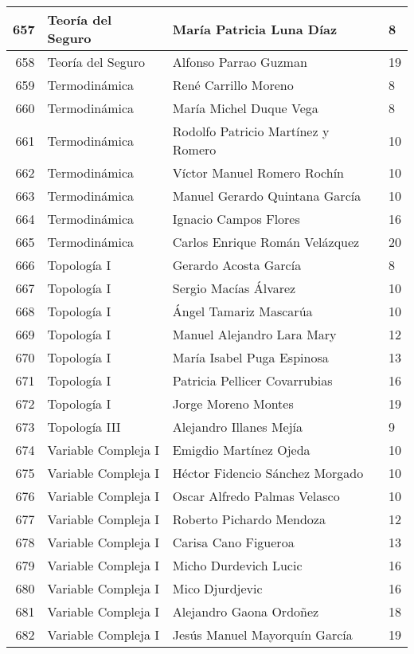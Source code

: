 \begin{table}[ht]
\begin{tabular}{rlll}
  657 & Teoría del Seguro & María Patricia Luna Díaz & 8 \\ \hline
  658 & Teoría del Seguro & Alfonso Parrao Guzman & 19 \\ \hline
  659 & Termodinámica & René Carrillo Moreno & 8 \\ \hline
  660 & Termodinámica & María Michel Duque Vega & 8 \\ \hline
  661 & Termodinámica & Rodolfo Patricio Martínez y Romero & 10 \\ \hline
  662 & Termodinámica & Víctor Manuel Romero Rochín & 10 \\ \hline
  663 & Termodinámica & Manuel Gerardo Quintana García & 10 \\ \hline
  664 & Termodinámica & Ignacio Campos Flores & 16 \\ \hline
  665 & Termodinámica & Carlos Enrique Román Velázquez & 20 \\ \hline
  666 & Topología I & Gerardo Acosta García & 8 \\ \hline
  667 & Topología I & Sergio Macías Álvarez & 10 \\ \hline
  668 & Topología I & Ángel Tamariz Mascarúa & 10 \\ \hline
  669 & Topología I & Manuel Alejandro Lara Mary & 12 \\ \hline
  670 & Topología I & María Isabel Puga Espinosa & 13 \\ \hline
  671 & Topología I & Patricia Pellicer Covarrubias & 16 \\ \hline
  672 & Topología I & Jorge Moreno Montes & 19 \\ \hline
  673 & Topología III & Alejandro Illanes Mejía & 9 \\ \hline
  674 & Variable Compleja I & Emigdio Martínez Ojeda & 10 \\ \hline
  675 & Variable Compleja I & Héctor Fidencio Sánchez Morgado & 10 \\ \hline
  676 & Variable Compleja I & Oscar Alfredo Palmas Velasco & 10 \\ \hline
  677 & Variable Compleja I & Roberto Pichardo Mendoza & 12 \\ \hline
  678 & Variable Compleja I & Carisa Cano Figueroa & 13 \\ \hline
  679 & Variable Compleja I & Micho Durdevich Lucic & 16 \\ \hline
  680 & Variable Compleja I & Mico Djurdjevic & 16 \\ \hline
  681 & Variable Compleja I & Alejandro Gaona Ordoñez & 18 \\ \hline
  682 & Variable Compleja I & Jesús Manuel Mayorquín García & 19 \\ \hline
\end{tabular}
\end{table}
  